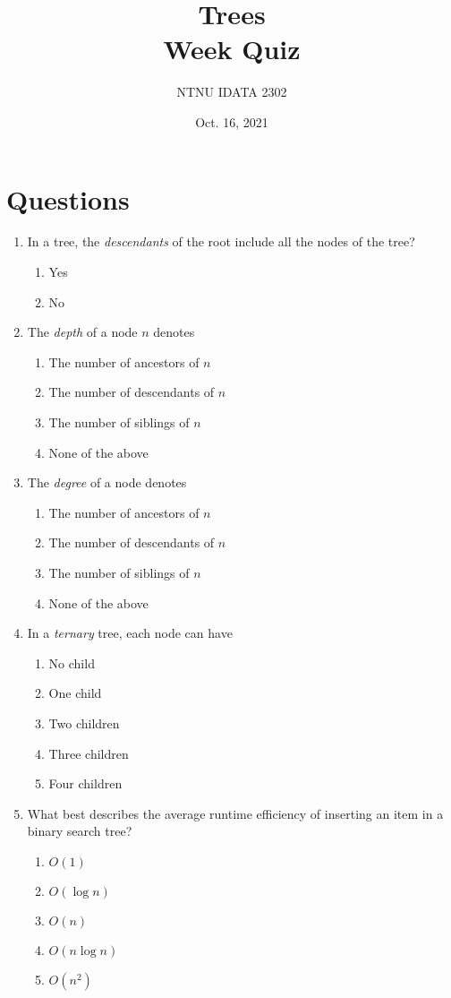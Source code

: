 \documentclass[11pt]{article}
\author{NTNU IDATA 2302}
\date{Oct. 16, 2021}
\title{Trees\\\medskip
\large Week  Quiz}
\begin{document}
\maketitle

\section{Questions}
\label{sec:orgd1d78e4}

\begin{enumerate}
\item In a tree, the \emph{descendants} of the root include all the nodes of
the tree?
\begin{enumerate}
\item Yes
\item No
\end{enumerate}

\item The \emph{depth} of a node \(n\) denotes
\begin{enumerate}
\item The number of ancestors of \(n\)
\item The number of descendants of \(n\)
\item The number of siblings of \(n\)
\item None of the above
\end{enumerate}

\item The \emph{degree} of a node denotes
\begin{enumerate}
\item The number of ancestors of \(n\)
\item The number of descendants of \(n\)
\item The number of siblings of \(n\)
\item None of the above
\end{enumerate}

\item In a \emph{ternary} tree, each node can have
\begin{enumerate}
\item No child
\item One child
\item Two children
\item Three children
\item Four children
\end{enumerate}

\item What best describes the average runtime efficiency of inserting an
item in a binary search tree?
\begin{enumerate}
\item \(O(1)\)
\item \(O(\log n)\)
\item \(O(n)\)
\item \(O(n \log n)\)
\item \(O(n^2)\)
\end{enumerate}


\end{enumerate}
\end{document}
